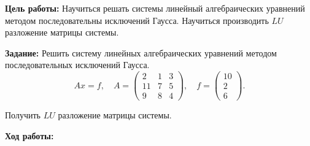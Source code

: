 \justifying
\textbf{Цель работы:}
Научиться решать системы линейный алгебраических уравнений методом последовательны исключений Гаусса. Научиться производить $LU$ разложение матрицы системы.

\textbf{Задание:}
Решить систему линейных алгебраических уравнений методом последовательных исключений Гаусса.
\begin{equation}\label{task}
    Ax = f,\quad A = 
    \begin{pmatrix}
    2 & 1 & 3 \\
    11 & 7 & 5 \\
    9 & 8 & 4
    \end{pmatrix}, \quad
    f = 
    \begin{pmatrix}
    10 \\
    2 \\
    6
    \end{pmatrix}.
\end{equation}

Получить $LU$ разложение матрицы системы.

\textbf{Ход работы:}

